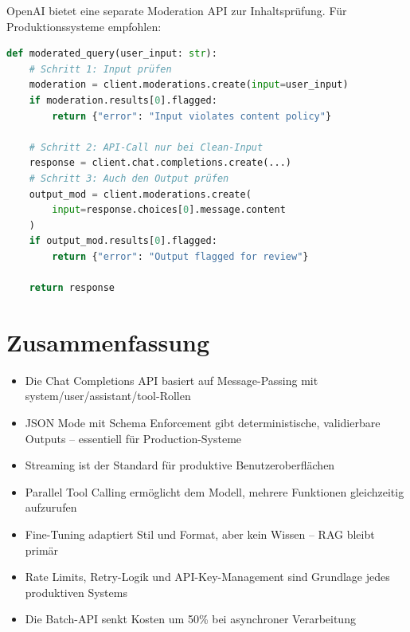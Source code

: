OpenAI bietet eine separate Moderation API zur Inhaltsprüfung. Für Produktionssysteme empfohlen:

\begin{lstlisting}[language=Python, caption={Content-Moderation vor dem API-Call}, label=lst:moderation]
def moderated_query(user_input: str):
    # Schritt 1: Input prüfen
    moderation = client.moderations.create(input=user_input)
    if moderation.results[0].flagged:
        return {"error": "Input violates content policy"}

    # Schritt 2: API-Call nur bei Clean-Input
    response = client.chat.completions.create(...)
    # Schritt 3: Auch den Output prüfen
    output_mod = client.moderations.create(
        input=response.choices[0].message.content
    )
    if output_mod.results[0].flagged:
        return {"error": "Output flagged for review"}

    return response
\end{lstlisting}

\section{Zusammenfassung}

\begin{itemize}[leftmargin=*]
    \item Die Chat Completions API basiert auf Message-Passing mit system/user/assistant/tool-Rollen
    \item JSON Mode mit Schema Enforcement gibt deterministische, validierbare Outputs -- essentiell für Production-Systeme
    \item Streaming ist der Standard für produktive Benutzeroberflächen
    \item Parallel Tool Calling ermöglicht dem Modell, mehrere Funktionen gleichzeitig aufzurufen
    \item Fine-Tuning adaptiert Stil und Format, aber kein Wissen -- RAG bleibt primär
    \item Rate Limits, Retry-Logik und API-Key-Management sind Grundlage jedes produktiven Systems
    \item Die Batch-API senkt Kosten um 50\% bei asynchroner Verarbeitung
\end{itemize}




